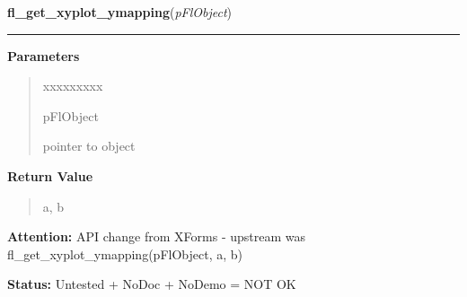 \hspace{.8\funcindent}\begin{boxedminipage}{\funcwidth}

    \raggedright \textbf{fl\_get\_xyplot\_ymapping}(\textit{pFlObject})

    \vspace{-1.5ex}

    \rule{\textwidth}{0.5\fboxrule}
\setlength{\parskip}{2ex}
\setlength{\parskip}{1ex}
      \textbf{Parameters}
      \vspace{-1ex}

      \begin{quote}
        \begin{Ventry}{xxxxxxxxx}

          \item[pFlObject]

          pointer to object

        \end{Ventry}

      \end{quote}

      \textbf{Return Value}
    \vspace{-1ex}

      \begin{quote}
      a, b

      \end{quote}

\textbf{Attention:} API change from XForms - upstream was fl\_get\_xyplot\_ymapping(pFlObject, 
a, b)



\textbf{Status:} Untested + NoDoc + NoDemo = NOT OK



    \end{boxedminipage}

    \label{xformslib:flxyplot:fl_set_xyplot_keys}

    \vspace{0.5ex}

